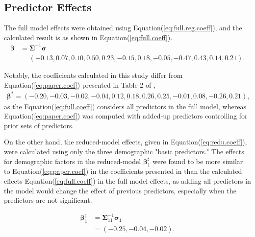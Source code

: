 \subsection{Predictor Effects}
The full model effects were obtained using Equation(\ref{eq:full.reg.coeff}), and the calculated result is as shown in  Equation(\ref{eq:full.coeff}). 
\begin{equation}\begin{aligned}
\label{eq:full.coeff}
\boldsymbol{\beta} &= \boldsymbol{\Sigma}^{-1}\boldsymbol{\sigma} \\
&= (-0.13,  0.07,  0.10,  0.50,  0.23, -0.15,  0.18, -0.05, -0.47,  0.43,  0.14,  0.21). 
\end{aligned}\end{equation}

Notably, the coefficients calculated in this study differ from Equation(\ref{eq:paper.coef}) presented in Table 2 of \cite{baker2008chronicpain},
\begin{equation}\begin{aligned}
\label{eq:paper.coef}\boldsymbol{\beta^*} = (-0.20, -0.03, -0.02, -0.04, 0.12, 0.18, 0.26, 0.25, -0.01, 0.08, -0.26, 0.21),\end{aligned}\end{equation}
 as the Equation(\ref{eq:full.coeff}) considers all predictors in the full model, whereas Equation(\ref{eq:paper.coef}) was computed with added-up predictors controlling for prior sets of predictors. 

On the other hand, the reduced-model effects, given in Equation(\ref{eq:redu.coeff}), were calculated using only the three demographic "basic predictors." The effects for demographic factors in the reduced-model $\boldsymbol{\beta}_1^\sharp$ were found to be more similar to Equation(\ref{eq:paper.coef}) in the coefficients presented in \cite{baker2008chronicpain} than the calculated effects Equation(\ref{eq:full.coeff}) in the full model effects, as adding all predictors in the model would change the effect of previous predictors, especially when the predictors are not significant.

\begin{equation}\begin{aligned}
\label{eq:redu.coeff}
\boldsymbol{\beta}_1^\sharp &= \boldsymbol{\Sigma}_{11}^{-1}\boldsymbol{\sigma}_1\\
&=(-0.25 , -0.04,  -0.02).
\end{aligned}\end{equation}



